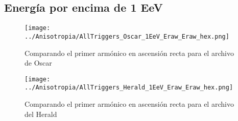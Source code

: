 %









\subsection{Energía por encima de 1 EeV}

\begin{figure}[H]
	\centering
	\texttt{[image: ../Anisotropia/AllTriggers\_Oscar\_1EeV\_Eraw\_Eraw\_hex.png]}
	\caption{Comparando el primer armónico en ascensión recta para el archivo de Oscar}
\end{figure}

\begin{figure}[H]
	\centering
	\texttt{[image: ../Anisotropia/AllTriggers\_Herald\_1EeV\_Eraw\_Eraw\_hex.png]}
	\caption{Comparando el primer armónico en ascensión recta para el archivo del Herald}
\end{figure}


